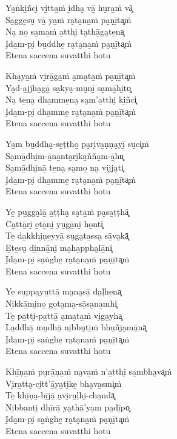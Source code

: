 \begin{paritta}

Ya̱ṅki̱ñci̮ vi̱tta̱ṁ i̮dha̮ vā̱ hu̮ra̱ṁ vā͓\\
Sa̱gge̱su̮ vā̱ ya̱ṁ ra̮ta̮na̱ṁ pa̮ṇī̱ta͓ṁ\\
Na̮ no̱ sa̮ma̱ṁ a̱tthi̮ ta̮thā̱ga̮te̱na͓\\
I̮da̱m-pi̮ bu̱ddhe̱ ra̮ta̮na̱ṁ pa̮ṇī̱ta͓ṁ\\
Etena saccena suvatthi hotu

Kha̮ya̱ṁ vi̮rā̱ga̱ṁ a̮ma̮ta̱ṁ pa̮ṇī̱ta͓ṁ\\
Ya̮d-a̱jjha̮gā̱ sa̱kya̮-mu̮nī̱ sa̮mā̱hi̮to͓\\
Na̮ te̱na̮ dha̱mme̱na̮ sa̮m'a̱tthi̮ ki̱ñci͓\\
I̮da̱m-pi̮ dha̱mme̱ ra̮ta̮na̱ṁ pa̮ṇī̱ta͓ṁ\\
Etena saccena suvatthi hotu

Ya̱m bu̱ddha̮-se̱ṭṭho̱ pa̮ri̮va̱ṇṇa̮yī̱ su̮ci͓ṁ\\
Sa̮mā̱dhi̮m-ā̱na̱nta̮ri̮ka̱ñña̮m-ā̱hu͓\\
Sa̮mā̱dhi̮nā̱ te̱na̮ sa̮mo̱ na̮ vi̱jja̮ti͓\\
I̮da̱m-pi̮ dha̱mme̱ ra̮ta̮na̱ṁ pa̮ṇī̱ta͓ṁ\\
Etena saccena suvatthi hotu

Ye̱ pu̱gga̮lā̱ a̱ṭṭha̮ sa̮ta̱ṁ pa̮sa̱ṭṭhā͓\\
Ca̱ttā̱ri̮ e̱tā̱ni̮ yu̮gā̱ni̮ ho̱nti͓\\
Te̱ da̱kkhi̮ṇe̱yyā̱ su̮ga̮ta̱ssa̮ sā̱va̮kā͓\\
E̱te̱su̮ di̱nnā̱ni̮ ma̮ha̱ppha̮lā̱ni͓\\
I̮da̱m-pi̮ sa̱ṅghe̱ ra̮ta̮na̱ṁ pa̮ṇī̱ta͓ṁ\\
Etena saccena suvatthi hotu

\clearpage

Ye̱ su̱ppa̮yu̱ttā̱ ma̮na̮sā̱ da̮ḷhe̱na͓\\
Ni̱kkā̱mi̮no̱ go̱ta̮ma̮-sā̱sa̮na̱mhi͓\\
Te̱ pa̱tti̮-pa̱ttā̱ a̮ma̮ta̱ṁ vi̮ga̱yha͓\\
La̱ddhā̱ mu̮dhā̱ ni̱bbu̮ti̱ṁ bhu̱ñja̮mā̱nā͓\\
I̮da̱m-pi̮ sa̱ṅghe̱ ra̮ta̮na̱ṁ pa̮ṇī̱ta͓ṁ\\
Etena saccena suvatthi hotu

Khī̱ṇa̱ṁ pu̮rā̱ṇa̱ṁ na̮va̱ṁ n'a̱tthi̮ sa̱mbha̮va͓ṁ\\
Vi̮ra̱tta̮-ci̱tt'ā̱ya̮ti̮ke̱ bha̮va̱smi͓ṁ\\
Te̱ khī̱ṇa̮-bī̱jā̱ a̮vi̮ru̮ḷhi̮-cha̱ndā͓\\
Ni̱bba̱nti̮ dhī̱rā̱ ya̮thā̱'ya̱m pa̮dī̱po͓\\
I̮da̱m-pi̮ sa̱ṅghe̱ ra̮ta̮na̱ṁ pa̮ṇī̱ta͓ṁ\\
Etena saccena suvatthi hotu


\end{paritta}

